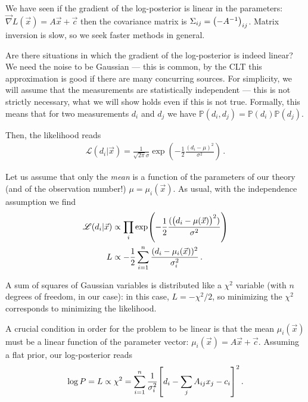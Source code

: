 \documentclass[main.tex]{subfiles}
\begin{document}

We have seen if the gradient of the log-posterior is linear in the parameters: \(\vec{\nabla} L (\vec{x}) = A \vec{x} + \vec{c}\) then the covariance matrix is \(\Sigma_{ij} = \qty(- A^{-1})_{ij}\).
Matrix inversion is slow, so we seek faster methods in general. 

Are there situations in which the gradient of the log-posterior is indeed linear?
We need the noise to be Gaussian --- this is common, by the CLT this approximation is good if there are many concurring sources. 
For simplicity, we will assume that the measurements are statistically independent --- this is not strictly necessary, what we will show holds even if this is not true.
Formally, this means that for two measurements \(d_i\) and \(d_j\) we have \(\mathbb{P}(d_i, d_j) = \mathbb{P}(d_i) \mathbb{P}(d_j)\). 

Then, the likelihood reads 
%
\begin{align}
\mathscr{L} (d_i | \vec{x}) = \frac{1}{\sqrt{2 \pi } \sigma }
\exp(- \frac{1}{2} \frac{(d_i - \mu )^2}{\sigma^2})
\,.
\end{align}

Let us assume that only the \emph{mean} is a function of the parameters of our theory (and of the observation number!) \(\mu = \mu_i (\vec{x})\). 
As usual, with the independence assumption we find 
%
\begin{align}
\mathscr{L} (d_i | \vec{x}) &\propto \prod_i 
\exp(- \frac{1}{2} \frac{(\qty(d_i - \mu (\vec{x}))^2)}{\sigma^2})   \\
L &\propto - \frac{1}{2} \sum _{i=1}^{n} \frac{(d_i - \mu _i (\vec{x}))^2}{\sigma_i^2} 
\,.
\end{align}

A sum of squares of Gaussian variables is distributed like a \(\chi^2\) variable (with \(n\) degrees of freedom, in our case): in this case, \(L = - \chi^2 / 2\), so minimizing the \(\chi^2\) corresponds to minimizing the likelihood.

A crucial condition in order for the problem to be linear is that the mean \(\mu _i (\vec{x})\) must be a linear function of the parameter vector: \(\mu _i (\vec{x}) = A \vec{x} + \vec{c}\).
Assuming a flat prior, our log-posterior reads 
%
\begin{align}
\log P = L \propto \chi^2 = \sum _{i=1}^{n} \frac{1}{\sigma_i^2}
\qty[ d_i - \sum _{j} A_{ij} x_j - c_i ]^2
\,.
\end{align}
\end{document}
